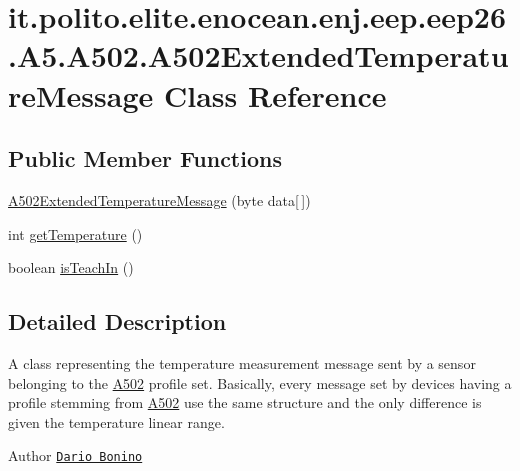 \hypertarget{classit_1_1polito_1_1elite_1_1enocean_1_1enj_1_1eep_1_1eep26_1_1_a5_1_1_a502_1_1_a502_extended_temperature_message}{}\section{it.\+polito.\+elite.\+enocean.\+enj.\+eep.\+eep26.\+A5.\+A502.\+A502\+Extended\+Temperature\+Message Class Reference}
\label{classit_1_1polito_1_1elite_1_1enocean_1_1enj_1_1eep_1_1eep26_1_1_a5_1_1_a502_1_1_a502_extended_temperature_message}
\subsection*{Public Member Functions}
\begin{DoxyCompactItemize}
\item 
\hyperlink{classit_1_1polito_1_1elite_1_1enocean_1_1enj_1_1eep_1_1eep26_1_1_a5_1_1_a502_1_1_a502_extended_temperature_message_aa53156c1aac4243a0434803b93c0b86e}{A502\+Extended\+Temperature\+Message} (byte data\mbox{[}$\,$\mbox{]})
\item 
int \hyperlink{classit_1_1polito_1_1elite_1_1enocean_1_1enj_1_1eep_1_1eep26_1_1_a5_1_1_a502_1_1_a502_extended_temperature_message_a75422d6f7fb97fa4115b57791daf4af2}{get\+Temperature} ()
\item 
boolean \hyperlink{classit_1_1polito_1_1elite_1_1enocean_1_1enj_1_1eep_1_1eep26_1_1_a5_1_1_a502_1_1_a502_extended_temperature_message_a0f5ea72da30ca059d36ecba516683961}{is\+Teach\+In} ()
\end{DoxyCompactItemize}


\subsection{Detailed Description}
A class representing the temperature measurement message sent by a sensor belonging to the \hyperlink{classit_1_1polito_1_1elite_1_1enocean_1_1enj_1_1eep_1_1eep26_1_1_a5_1_1_a502_1_1_a502}{A502} profile set. Basically, every message set by devices having a profile stemming from \hyperlink{classit_1_1polito_1_1elite_1_1enocean_1_1enj_1_1eep_1_1eep26_1_1_a5_1_1_a502_1_1_a502}{A502} use the same structure and the only difference is given the temperature linear range.

\begin{DoxyAuthor}{Author}
\href{mailto:dario.bonino@gmail.com}{\tt Dario Bonino} 
\end{DoxyAuthor}


